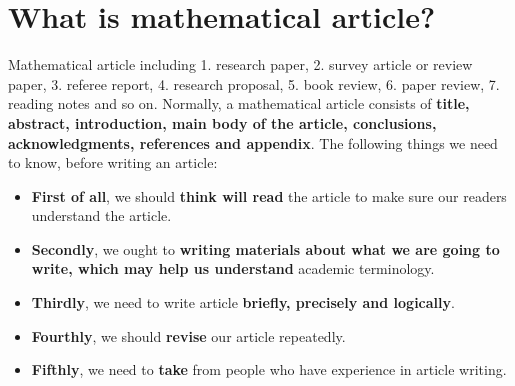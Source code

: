 




\section{What is  mathematical article?}
Mathematical article including 1. research paper, 2. survey article or review paper, 3. referee report, 4. research proposal, 5. book review, 6. paper review, 7. reading notes and so on. Normally, a mathematical article consists of \textbf{title, abstract, introduction, main body of the article, conclusions, acknowledgments, references and appendix}. The following things we need to know, before writing an article:
\begin{itemize}
	\item \textbf{First of all}, we should \textbf{think  will read} the article to make sure our readers understand the article.
	\item \textbf{Secondly}, we ought to \textbf{ writing materials about what we are going to write, which may help us understand} academic terminology.
	\item \textbf{Thirdly}, we need to write  article \textbf{briefly, precisely and logically}.
	\item \textbf{Fourthly}, we should \textbf{revise} our article repeatedly.
	\item \textbf{Fifthly}, we need to \textbf{take } from people who have experience in article writing.
\end{itemize}



